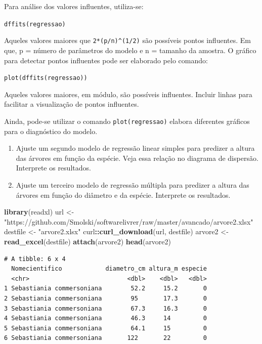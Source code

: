 \documentclass[12pt,brazil,oneside]{book}
\newenvironment{Shaded}{\begin{snugshade}}{\end{snugshade}}
\newcommand{\KeywordTok}[1]{\textcolor[rgb]{0.13,0.29,0.53}{\textbf{#1}}}
\newcommand{\NormalTok}[1]{#1}
\newcommand{\OperatorTok}[1]{\textcolor[rgb]{0.81,0.36,0.00}{\textbf{#1}}}
\newcommand{\StringTok}[1]{\textcolor[rgb]{0.31,0.60,0.02}{#1}}
\begin{document}
Para análise dos valores influentes, utiliza-se:

\texttt{dffits(regressao)}

Aqueles valores maiores que \texttt{2*(p/n)\^{}(1/2)} são possíveis
pontos influentes. Em que, p = número de parâmetros do modelo e n =
tamanho da amostra. O gráfico para detectar pontos influentes pode ser
elaborado pelo comando:

\texttt{plot(dffits(regressao))}

Aqueles valores maiores, em módulo, são possíveis influentes. Incluir
linhas para facilitar a visualização de pontos influentes.

Ainda, pode-se utilizar o comando \texttt{plot(regressao)} elabora
diferentes gráficos para o diagnóstico do modelo.

\begin{enumerate}
\def\labelenumi{\arabic{enumi})}
\setcounter{enumi}{1}
\item
  Ajuste um segundo modelo de regressão linear simples para predizer a
  altura das árvores em função da espécie. Veja essa relação no diagrama
  de dispersão. Interprete os resultados.
\item
  Ajuste um terceiro modelo de regressão múltipla para predizer a altura
  das árvores em função do diâmetro e da espécie. Interprete os
  resultados.
\end{enumerate}

\begin{Shaded}
\begin{Highlighting}[]
\KeywordTok{library}\NormalTok{(readxl)}
\NormalTok{url <-}\StringTok{ "https://github.com/Smolski/softwarelivrer/raw/master/avancado/arvore2.xlsx"}
\NormalTok{destfile <-}\StringTok{ "arvore2.xlsx"}
\NormalTok{curl}\OperatorTok{::}\KeywordTok{curl_download}\NormalTok{(url, destfile)}
\NormalTok{arvore2 <-}\StringTok{ }\KeywordTok{read_excel}\NormalTok{(destfile)}
\KeywordTok{attach}\NormalTok{(arvore2)}
\KeywordTok{head}\NormalTok{(arvore2)}
\end{Highlighting}
\end{Shaded}

\begin{verbatim}
# A tibble: 6 x 4
  Nomecientifico            diametro_cm altura_m especie
  <chr>                           <dbl>    <dbl>   <dbl>
1 Sebastiania commersoniana        52.2     15.2       0
2 Sebastiania commersoniana        95       17.3       0
3 Sebastiania commersoniana        67.3     16.3       0
4 Sebastiania commersoniana        46.3     14         0
5 Sebastiania commersoniana        64.1     15         0
6 Sebastiania commersoniana       122       22         0
\end{verbatim}
\end{document}
